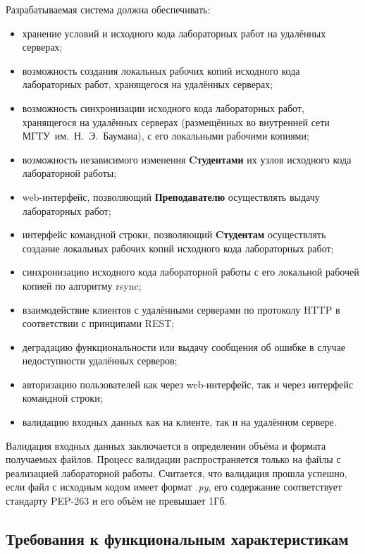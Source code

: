 \documentclass{bmstu}
\begin{document}
  Разрабатываемая система должна обеспечивать:
  \begin{itemize}[label=---]
    \item хранение условий и исходного кода лабораторных работ на
      удалённых серверах;
    \item возможность создания локальных рабочих копий исходного кода
      лабораторных работ, хранящегося на удалённых серверах;
    \item возможность синхронизации исходного кода лабораторных работ,
      хранящегося на удалённых серверах (размещённых во внутренней сети
      МГТУ~им.~Н.~Э.~Баумана), с его локальными рабочими копиями;
    \item возможность независимого изменения \textbf{Cтудентами} их узлов
    исходного кода лабораторной работы;
    \item web-интерфейс, позволяющий \textbf{Преподавателю} осуществлять выдачу
    лабораторных работ;
    \item интерфейс командной строки, позволяющий \textbf{Cтудентам}
    осуществлять создание локальных рабочих копий исходного кода
    лабораторных работ;
    \item синхронизацию исходного кода лабораторной работы с его локальной
    рабочей копией по алгоритму rsync;
    \item взаимодействие клиентов с удалёнными серверами по протоколу
    HTTP в соответствии с принципами REST;
    \item деградацию функциональности или выдачу сообщения об ошибке в
    случае недоступности удалённых серверов;
    \item авторизацию пользователей как через web-интерфейс, так и
    через интерфейс командной строки;
    \item валидацию входных данных как на клиенте, так и на удалённом
    сервере.
  \end{itemize}
  
  Валидация входных данных заключается в определении объёма и формата получаемых файлов.
  Процесс валидации распространяется только на файлы с реализацией лабораторной работы.
  Считается, что валидация прошла успешно, если файл с исходным кодом имеет формат \textit{.py}, его содержание соответствует стандарту PEP-263 и его объём не превышает 1Гб.

  \subsection{Требования к функциональным характеристикам}
\end{document}
